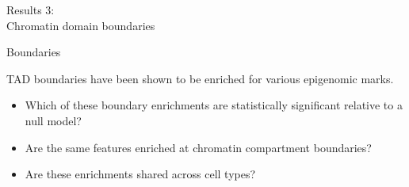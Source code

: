 \documentclass{beamer}
\begin{document}
{
\begin{frame}{}
\begin{tcolorbox}[colback=blue!40!black,colframe=blue!40!black]
\begin{center}
{
{\small Results 3: } \\
 Chromatin domain boundaries}
\end{center}
\end{tcolorbox}
\end{frame}
}


\begin{frame}{Boundaries}

TAD boundaries have been shown to be enriched for various epigenomic marks. \\

\vspace{2em}

\begin{itemize}
\item Which of these boundary enrichments are statistically significant relative to a null model?
\item Are the same features enriched at chromatin compartment boundaries?
\item Are these enrichments shared across cell types?
\end{itemize}

\end{frame}
\end{document}
